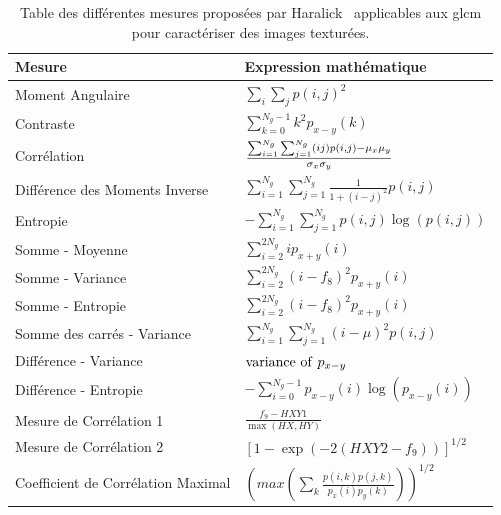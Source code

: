 \begin{table}[H]
    \centering
    \begin{tabular}{ll}
        \toprule
        \textbf{Mesure}                     & \textbf{Expression mathématique}                                                              \\ \hline
        Moment Angulaire                    & $ \sum_i\sum_jp(i,j)^2$                                                                       \\
        Contraste                           & $\sum_{k=0}^{N_g-1} k^2 p_{x-y}(k)$                                                           \\
        Corrélation                         & $\frac{\Large{\sum_{i=1}^{N_g}\sum_{j=1}^{N_g}} (ij)p(i,j) - \mu_x\mu_y}{\sigma_x\sigma_y}$   \\
        Différence des Moments Inverse      & $\sum_{i=1}^{N_g}\sum_{j=1}^{N_g} \frac{1}{1 + (i - j)^2} p(i,j)$                             \\   
        Entropie                            & $-\sum_{i=1}^{N_g}\sum_{j=1}^{N_g} p(i,j) \log(p(i,j))$                                       \\   
        Somme - Moyenne                     & $\sum_{i=2}^{2N_g} i p_{x+y}(i)$                                                              \\    
        Somme - Variance                    & $\sum_{i=2}^{2N_g} (i - f_8)^2 p_{x+y}(i)$                                                    \\    
        Somme - Entropie                    & $\sum_{i=2}^{2N_g} (i - f_8)^2 p_{x+y}(i)$                                                    \\    
        Somme des carrés - Variance         & $\sum_{i=1}^{N_g}\sum_{j=1}^{N_g} (i - \mu)^2 p(i,j)$                                         \\   
        Différence - Variance               & ${\rm variance \ of ~} p_{x-y}$                                                               \\    
        Différence - Entropie               & $-\sum_{i=0}^{N_g-1} p_{x-y}(i) \log(p_{x-y}(i))$                                             \\
        Mesure de Corrélation 1             & $\frac{f_9 - HXY1}{\max(HX,HY)}$                                                              \\  
        Mesure de Corrélation 2             & $[1 - \exp(-2(HXY2 - f_9))]^{1/2}$                                                            \\ 
        Coefficient de Corrélation Maximal  & $(max(\sum_k \frac{p(i,k)p(j,k)}{p_x(i)p_y(k)}))^{1/2}$                                       \\ 
        \bottomrule
    \end{tabular}
    \caption{Table des différentes mesures proposées par Haralick~ applicables aux \gls{glcm} pour caractériser des images texturées.}
    \label{tab:haralick_descriptors}
\end{table}\par
 
